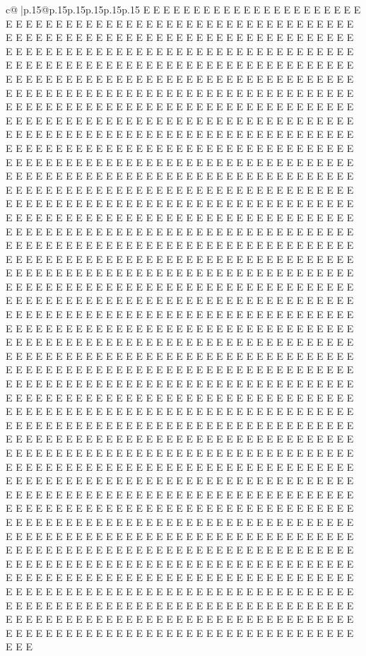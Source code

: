 \documentclass{article}
\begin{document}
{\begin{supertabular}{c@{$\;$}|p{.15\linewidth}@{}p{.15\linewidth}p{.15\linewidth}p{.15\linewidth}p{.15\linewidth}p{.15\linewidth}}
{{{E E E E E E E E E E E E E E E E E E E E E E E E E E E E E E E E E E E E E E E E E E E E E E E E E E E E E E E E E E E E E E E E E E E E E E E E E E E E E E E E E E E E E E E E E E E E E E E E E E E E E E E E E E E E E E E E E E E E E E E E E E E E E E E E E E E E E E E E E E E E E E E E E E E E E E E E E E E E E E E E E E E E E E E E E E E E E E E E E E E E E E E E E E E E E E E E E E E E E E E E E E E E E E E E E E E E E E E E E E E E E E E E E E E E E E E E E E E E E E E E E E E E E E E E E E E E E E E E E E E E E E E E E E E E E E E E E E E E E E E E E E E E E E E E E E E E E E E E E E E E E E E E E E E E E E E E E E E E E E E E E E E E E E E E E E E E E E E E E E E E E E E E E E E E E E E E E E E E E E E E E E E E E E E E E E E E E E E E E E E E E E E E E E E E E E E E E E E E E E E E E E E E E E E E E E E E E E E E E E E E E E E E E E E E E E E E E E E E E E E E E E E E E E E E E E E E E E E E E E E E E E E E E E E E E E E E E E E E E E E E E E E E E E E E E E E E E E E E E E E E E E E E E E E E E E E E E E E E E E E E E E E E E E E E E E E E E E E E E E E E E E E E E E E E E E E E E E E E E E E E E E E E E E E E E E E E E E E E E E E E E E E E E E E E E E E E E E E E E E E E E E E E E E E E E E E E E E E E E E E E E E E E E E E E E E E E E E E E E E E E E E E E E E E E E E E E E E E E E E E E E E E E E E E E E E E E E E E E E E E E E E E E E E E E E E E E E E E E E E E E E E E E E E E E E E E E E E E E E E E E E E E E E E E E E E E E E E E E E E E E E E E E E E E E E E E E E E E E E E E E E E E E E E E E E E E E E E E E E E E E E E E E E E E E E E E E E E E E E E E E E E E E E E E E E E E E E E E E E E E E E E E E E E E E E E E E E E E E E E E E E E E E E E E E E E E E E E E E E E E E E E E E E E E E E E E E E E E E E E E E E E E E E E E E E E E E E E E E E E E E E E E E E E E E E E E E E E E E E E E E E E E E E E E E E E E E E E E E E E E E E E E E E E E E E E E E E E E E E E E E E E E E E E E E E E E E E E E E E E E E E E E E E E E E E E E E E E E E E E E E E E E E E E E E E E E E E E E E E E E E E E E E E E E E E E E E E E E E E E E E E E E E E E E E E E E E E E E E E E E E E E E E E E E E E E E E E E E E E E E E E E E E E E E E E E E E E E E E E E E E E E E E E E E E E E E E E E E E E E E E E E E E E E E E E E E E E E E E E E E E E E E E E E E E E E E E E E E E E E E E E E E E E E E E E E E E E E E E E E E E E E E E E E E E E E E E E E E E E E E E E E E E E E E E E E E E E E E E E E E E E E E E E E E E E E E E E E E E E E E E E E E E E E E E E E E E E E E E E E E E E E E E E E E E E E E E E E E E E E E E E E E E E E E E E E E E E E E E E E E E E E E E E E E E E E E E E E E E E E E E E E E E E E E E E E E E E E E E E E E E E E E E E E E E E E E E E E E E E E E E E E E E E E E E E E E E E E E E E E E E E E E E E E E E E E E E E E E E E E E E E E E E E E E E E E E E E E E E E E E E E E E E E E E E E E E E E E E E E E E E E E E E E E E E E E E E E E E E E E E E E E E E E E E E E E E E E E E E E E E E E E E E E E E E E E E E E E E E E E E E E E E E E E E E E E E E E E E E E E E E E E E E E E E E E E E E E E E E E E E E E E E E E E E E E E E E E E E E E E E E E E E E E E E E E E E E E E E E E E E E E E E E E E E E E E E E E E E E E E E E }}}
\end{supertabular}}
\end{document}
